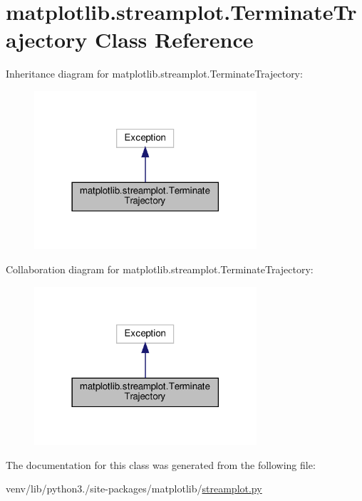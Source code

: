 \hypertarget{classmatplotlib_1_1streamplot_1_1TerminateTrajectory}{}\section{matplotlib.\+streamplot.\+Terminate\+Trajectory Class Reference}
\label{classmatplotlib_1_1streamplot_1_1TerminateTrajectory}


Inheritance diagram for matplotlib.\+streamplot.\+Terminate\+Trajectory\+:
\nopagebreak
\begin{figure}[H]
\begin{center}
\leavevmode
\includegraphics[width=234pt]{classmatplotlib_1_1streamplot_1_1TerminateTrajectory__inherit__graph}
\end{center}
\end{figure}


Collaboration diagram for matplotlib.\+streamplot.\+Terminate\+Trajectory\+:
\nopagebreak
\begin{figure}[H]
\begin{center}
\leavevmode
\includegraphics[width=234pt]{classmatplotlib_1_1streamplot_1_1TerminateTrajectory__coll__graph}
\end{center}
\end{figure}


The documentation for this class was generated from the following file\+:\begin{DoxyCompactItemize}
\item 
venv/lib/python3./site-\/packages/matplotlib/\hyperlink{streamplot_8py}{streamplot.\+py}\end{DoxyCompactItemize}
